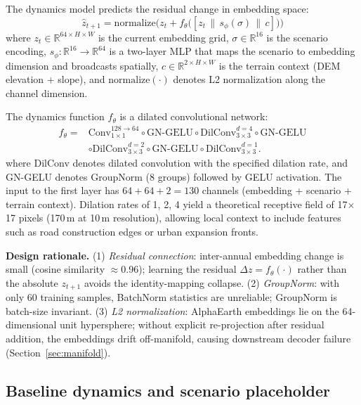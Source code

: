 \documentclass{article}
\begin{document}
The dynamics model predicts the residual change in embedding space:
\begin{equation}
\hat{z}_{t+1} = \text{normalize}\Big(z_t + f_\theta\big([z_t \,\|\, s_\phi(\sigma) \,\|\, c]\big)\Big)
\label{eq:dynamics}
\end{equation}
where $z_t \in \mathbb{R}^{64 \times H \times W}$ is the current embedding grid, $\sigma \in \mathbb{R}^{16}$ is the scenario encoding, $s_\phi: \mathbb{R}^{16} \to \mathbb{R}^{64}$ is a two-layer MLP that maps the scenario to embedding dimension and broadcasts spatially, $c \in \mathbb{R}^{2 \times H \times W}$ is the terrain context (DEM elevation + slope), and $\text{normalize}(\cdot)$ denotes L2 normalization along the channel dimension.

The dynamics function $f_\theta$ is a dilated convolutional network:
\begin{equation}
\begin{aligned}
f_\theta ={}& \text{Conv}_{1\times1}^{128 \to 64} \circ \text{GN-GELU}
\circ \text{DilConv}_{3\times3}^{d=4} \circ \text{GN-GELU} \\
& \circ \text{DilConv}_{3\times3}^{d=2} \circ \text{GN-GELU}
\circ \text{DilConv}_{3\times3}^{d=1}.
\end{aligned}
\end{equation}
where DilConv denotes dilated convolution with the specified dilation rate, and GN-GELU denotes GroupNorm (8 groups) followed by GELU activation. The input to the first layer has $64 + 64 + 2 = 130$ channels (embedding + scenario + terrain context). Dilation rates of 1, 2, 4 yield a theoretical receptive field of 17$\times$17 pixels (170\,m at 10\,m resolution), allowing local context to include features such as road construction edges or urban expansion fronts.

\textbf{Design rationale.} (1) \textit{Residual connection}: inter-annual embedding change is small (cosine similarity $\approx$0.96); learning the residual $\Delta z = f_\theta(\cdot)$ rather than the absolute $z_{t+1}$ avoids the identity-mapping collapse. (2) \textit{GroupNorm}: with only 60 training samples, BatchNorm statistics are unreliable; GroupNorm is batch-size invariant. (3) \textit{L2 normalization}: AlphaEarth embeddings lie on the 64-dimensional unit hypersphere; without explicit re-projection after residual addition, the embeddings drift off-manifold, causing downstream decoder failure (Section~\ref{sec:manifold}).

\subsection{Baseline dynamics and scenario placeholder}
\end{document}
